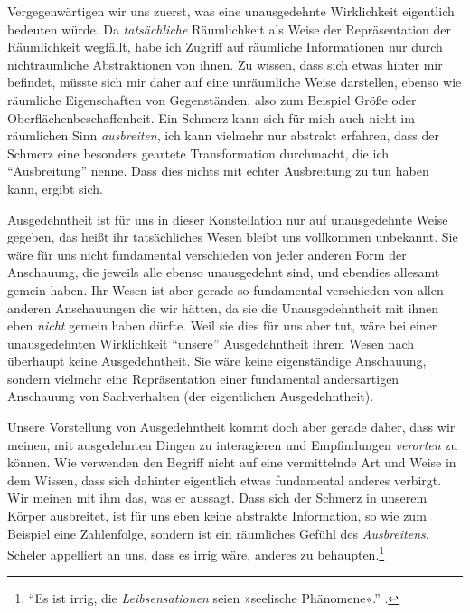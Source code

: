 \documentclass[a4paper, 12pt]{article}
\begin{document}
\begin{onehalfspace}

Vergegenwärtigen wir uns zuerst, was eine unausgedehnte Wirklichkeit eigentlich bedeuten würde. Da \emph{tatsächliche} Räumlichkeit als Weise der Repräsentation der Räumlichkeit wegfällt, habe ich Zugriff auf räumliche Informationen nur durch nichträumliche Abstraktionen von ihnen. Zu wissen, dass sich etwas hinter mir befindet, müsste sich mir daher auf eine unräumliche Weise darstellen, ebenso wie räumliche Eigenschaften von Gegenständen, also zum Beispiel Größe oder Oberflächenbeschaffenheit. Ein Schmerz kann sich für mich auch nicht im räumlichen Sinn \emph{ausbreiten}, ich kann vielmehr nur abstrakt erfahren, dass der Schmerz eine besonders geartete Transformation durchmacht, die ich "`Ausbreitung"' nenne. Dass dies nichts mit echter Ausbreitung zu tun haben kann, ergibt sich.

Ausgedehntheit ist für uns in dieser Konstellation nur auf unausgedehnte Weise gegeben, das heißt ihr tatsächliches Wesen bleibt uns vollkommen unbekannt. Sie wäre für uns nicht fundamental verschieden von jeder anderen Form der Anschauung, die jeweils alle ebenso unausgedehnt sind, und ebendies allesamt gemein haben. Ihr Wesen ist aber gerade so fundamental verschieden von allen anderen Anschauungen die wir hätten, da sie die Unausgedehntheit mit ihnen eben \emph{nicht} gemein haben dürfte. Weil sie dies für uns aber tut, wäre bei einer unausgedehnten Wirklichkeit "`unsere"' Ausgedehntheit ihrem Wesen nach überhaupt keine Ausgedehntheit. Sie wäre keine eigenständige Anschauung, sondern vielmehr eine Repräsentation einer fundamental andersartigen Anschauung von Sachverhalten (der eigentlichen Ausgedehntheit).

Unsere Vorstellung von Ausgedehntheit kommt doch aber gerade daher, dass wir meinen, mit ausgedehnten Dingen zu interagieren und Empfindungen \emph{verorten} zu können. Wie verwenden den Begriff nicht auf eine vermittelnde Art und Weise in dem Wissen, dass sich dahinter eigentlich etwas fundamental anderes verbirgt. Wir meinen mit ihm das, was er aussagt. Dass sich der Schmerz in unserem Körper ausbreitet, ist für uns eben keine abstrakte Information, so wie zum Beispiel eine Zahlenfolge, sondern ist ein räumliches Gefühl des \emph{Ausbreitens}. Scheler appelliert an uns, dass es irrig wäre, anderes zu behaupten.\footnote{"`Es ist irrig, die \emph{Leibsensationen} seien »seelische Phänomene«."' .} 



\end{onehalfspace}
\end{document}
